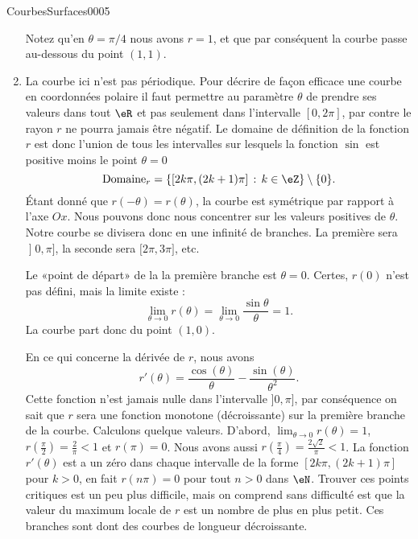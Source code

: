 \begin{corrige}{CourbesSurfaces0005}
\begin{enumerate}
			Notez qu'en $\theta=\pi/4$ nous avons $r=1$, et que par conséquent la courbe passe au-dessous du point $(1,1)$.
		\item
		  La courbe ici n'est pas périodique. Pour décrire de façon efficace une courbe en coordonnées polaire il faut permettre au paramètre $\theta$ de prendre ses valeurs dans tout $\eR$ et pas seulement dans l'intervalle $[0,2\pi]$, par contre le rayon $r$ ne pourra jamais être négatif. Le domaine de définition de la fonction $r$ est donc l'union de tous les intervalles sur lesquels la fonction $\sin$ est positive moins le point $\theta=0$
                  \begin{equation}
                    \textrm{Domaine}_r=\{[2k\pi, (2k+1)\pi]\,:\, k\in\eZ\}\setminus\{0\}.
                  \end{equation}
			Étant donné que $r(-\theta)=r(\theta)$, la courbe est symétrique par rapport à l'axe $Ox$. Nous pouvons donc nous concentrer sur les valeurs positives de $\theta$. Notre courbe se divisera donc en une infinité de branches. La première sera \( \mathopen] 0 , \pi \mathclose]\), la seconde sera \( \mathopen[ 2\pi , 3\pi \mathclose]\), etc.
            
            Le «point de départ» de la la première branche est \( \theta=0\). Certes, \( r(0)\) n'est pas défini, mais la limite existe :
            \begin{equation}
                \lim_{\theta\to 0} r(\theta)=\lim_{\theta\to 0} \frac{ \sin\theta }{ \theta }=1.
            \end{equation}
            La courbe part donc du point \( (1,0)\).

            
            
            
            En ce qui concerne la dérivée de $r$, nous avons
			\begin{equation}
				r'(\theta)=\frac{ \cos(\theta) }{ \theta }-\frac{ \sin(\theta) }{ \theta^2 }.
			\end{equation}
                        Cette fonction n'est jamais nulle dans l'intervalle $]0,\pi]$, par conséquence on sait que $r$ sera une fonction monotone (décroissante) sur la première branche de la courbe.  Calculons quelque valeurs. D'abord, $\lim_{\theta\to 0}r(\theta)=1$, $r(\frac{ \pi }{2})=\frac{ 2 }{ \pi }<1$ et $r(\pi)=0$. Nous avons aussi $r(\frac{ \pi }{ 4 })=\frac{ 2\sqrt{2} }{ \pi }<1$.
		        La fonction $r'(\theta)$ est a un zéro dans chaque intervalle de la forme $[2k\pi, (2k+1)\pi]$ pour $k>0$, en fait $r(n\pi)=0$ pour tout $n>0$ dans $\eN$. Trouver ces points critiques est un peu plus difficile, mais on comprend sans difficulté est que la valeur du maximum locale de $r$ est un nombre de plus en plus petit. Ces branches sont dont des courbes de longueur décroissante.  


\end{enumerate}
\end{corrige}
